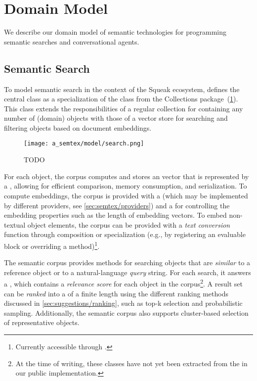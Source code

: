 
\section{Domain Model}
\label{sec:semtex/model}

We describe our domain model of semantic technologies for programming semantic searches and conversational agents.

\subsection{Semantic Search}
\label{sec:semtex/model/search}

To model semantic search in the context of the Squeak ecosystem, \semtex defines the central class  as a specialization of the  class from the Collections package~(\cref{fig:semtex/model/search}).
This class extends the responsibilities of a regular collection for containing any number of (domain) objects with those of a vector store for searching and filtering objects based on document embeddings.

\begin{figure}
	\centering
	\texttt{[image: a\_semtex/model/search.png]}
	\caption[TODO]{
		TODO
	}
	\label{fig:semtex/model/search}
\end{figure}

For each object, the corpus computes and stores an  vector that is represented by a , allowing for efficient comparison, memory consumption, and serialization.
To compute embeddings, the corpus is provided with a  (which may be implemented by different providers, see \cref{sec:semtex/providers}) and a  for controlling the embedding properties such as the length of embedding vectors.
To embed non-textual object elements, the corpus can be provided with a \emph{text conversion} function through composition or specialization (e.g., by registering an evaluable block or overriding a method)\footnote{Currently accessible through .}.

The semantic corpus provides methods for searching objects that are \emph{similar} to a reference object or to a natural-language \emph{query} string.
For each search, it answers a , which contains a \emph{relevance score} for each object in the corpus\footnote{At the time of writing, these classes have not yet been extracted from the  in our public implementation.}.
A result set can be \emph{ranked} into a  of a finite length using the different ranking methods discussed in \cref{sec:suggestions/ranking}, such as top-k selection and probabilistic sampling.
Additionally, the semantic corpus also supports cluster-based selection of representative objects.

